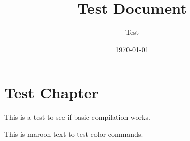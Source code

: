 \documentclass[oneside]{um}
\begin{document}
\title{Test Document}
\author{Test}
\date{\today}

\frontmatter
\maketitle

\mainmatter

\chapter{Test Chapter}
This is a test to see if basic compilation works.

{\color{maroon}
This is maroon text to test color commands.
}
\end{document}
